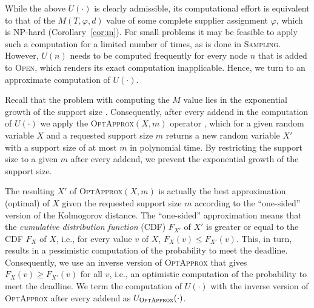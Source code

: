\documentclass[letterpaper]{article} %
\newcommand{\sampling}{\textsc{Sampling}\xspace}
\newcommand{\open}{\textsc{Open}\xspace}
\newcommand{\optapprox}{\textsc{OptApprox}\xspace}
\begin{document}



While the above $U(\cdot)$ is clearly admissible, its computational effort is equivalent to that of the $M(T,\varphi,d)$ value of some complete supplier assignment $\varphi$, which is NP-hard (Corollary~\ref{cor:m}). For small problems it may be feasible to apply such a computation for a limited number of times, as is done in \sampling. However, $U(n)$ needs to be computed frequently for every node $n$ that is added to \open, which renders its exact computation inapplicable. Hence, we turn to an approximate computation of $U(\cdot)$.

Recall that the problem with computing the $M$ value lies in the exponential growth of the support size \cite{cohen2015estimating}. Consequently, after every addend in the computation of $U(\cdot)$ we apply the \optapprox$(X,m)$ operator \cite{cohen2018optimal}, which for a given random variable $X$ and a requested support size $m$ returns a new random variable $X'$ with a support size of at most $m$ in polynomial time. By restricting the support size to a given $m$ after every addend, we prevent the exponential growth of the support size.

The resulting $X'$ of \optapprox$(X,m)$ is actually the best approximation (optimal) of $X$ given the requested support size $m$ according to the ``one-sided'' version of the Kolmogorov distance. The ``one-sided'' approximation means that the \emph{cumulative distribution function} (CDF) $F_{X'}$ of $X'$ is greater or equal to the CDF $F_{X}$ of $X$, i.e., for every value $v$ of $X$, $F_{X}(v)\leq F_{X'}(v)$. This, in turn, results in a pessimistic computation of the probability to meet the deadline. Consequently, we use an inverse version of \optapprox that gives $F_{X}(v)\geq F_{X'}(v)$ for all $v$, i.e., an optimistic computation of the probability to meet the deadline. We term the computation of $U(\cdot)$ with the inverse version of \optapprox after every addend as $U_{\optapprox}(\cdot)$. 
\end{document}
